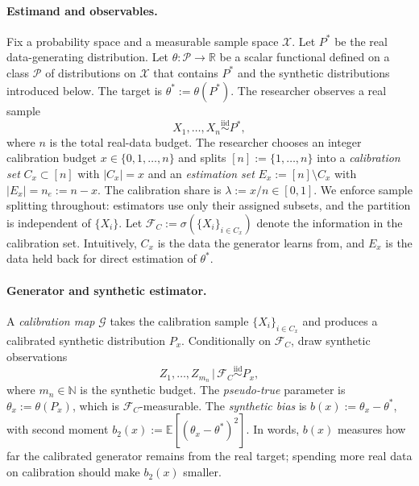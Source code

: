 \label{sec:setup}

\paragraph{Estimand and observables.}
Fix a probability space and a measurable sample space $\mathcal{X}$. Let $P^*$ be the real data-generating distribution. Let $\theta:\mathcal{P}\to\mathbb{R}$ be a scalar functional defined on a class $\mathcal{P}$ of distributions on $\mathcal{X}$ that contains $P^*$ and the synthetic distributions introduced below. The target is $\theta^*:=\theta(P^*)$. The researcher observes a real sample
\begin{equation*}
X_1,\dots,X_n \stackrel{\mathrm{iid}}{\sim} P^*,
\end{equation*}
where $n$ is the total real-data budget. The researcher chooses an integer calibration budget $x\in\{0,1,\dots,n\}$ and splits $[n]:=\{1,\dots,n\}$ into a \emph{calibration set} $C_x\subset[n]$ with $|C_x|=x$ and an \emph{estimation set} $E_x:=[n]\setminus C_x$ with $|E_x|=n_e:=n-x$. The calibration share is $\lambda := x/n\in[0,1]$. We enforce sample splitting throughout: estimators use only their assigned subsets, and the partition is independent of $\{X_i\}$. Let $\mathcal{F}_C := \sigma(\{X_i\}_{i\in C_x})$ denote the information in the calibration set. Intuitively, $C_x$ is the data the generator learns from, and $E_x$ is the data held back for direct estimation of $\theta^*$.

\paragraph{Generator and synthetic estimator.}
A \emph{calibration map} $\mathcal{G}$ takes the calibration sample $\{X_i\}_{i\in C_x}$ and produces a calibrated synthetic distribution $P_x$. Conditionally on $\mathcal{F}_C$, draw synthetic observations
\begin{equation*}
Z_1,\dots,Z_{m_n}\,\bigl|\,\mathcal{F}_C \stackrel{\mathrm{iid}}{\sim} P_x,
\end{equation*}
where $m_n\in\mathbb{N}$ is the synthetic budget. The \emph{pseudo-true} parameter is $\theta_x:=\theta(P_x)$, which is $\mathcal{F}_C$-measurable. The \emph{synthetic bias} is $b(x):=\theta_x-\theta^*$, with second moment $b_2(x):=\mathbb{E}[(\theta_x-\theta^*)^2]$. In words, $b(x)$ measures how far the calibrated generator remains from the real target; spending more real data on calibration should make $b_2(x)$ smaller.

